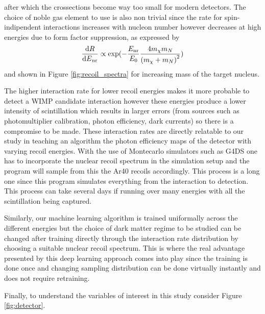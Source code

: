 \documentclass[11pt]{article} %
\begin{document}
after which the crossections become way too small for modern detectors.
The choice of noble gas element to use is also non trivial since the rate for spin-indipendent interactions increases with
nucleon number however decreases at high energies due to form factor suppression, as expressed by \cite{lewin1996review} 
\begin{equation}
\frac{{\rm{d}}{R}}{{{\rm{d}}{E}}_{\mathrm{nr}}}\propto \exp (- \frac{{E}_{\mathrm{nr}}}{{E}_{0}} \frac{4{m}_{\chi }{m}_{N}}{{({m}_{\chi }+{m}_{N})}^{2}})
\end{equation}
and shown in Figure \ref{fig:recoil_spectra} for increasing mass of the target nucleus.
\\
\par The higher interaction rate for lower recoil energies makes it more probable to detect a WIMP candidate interaction
however these energies produce a lower intensity of scintillation which results in larger errors
 (from sources such as photomultiplier calibration, photon efficiency, dark currents) so there is a compromise to be made.
These interaction rates are directly relatable to our study in teaching an algorithm the photon efficiency maps of the detector
with varying recoil energies.
With the use of Montecarlo simulators such as G4DS one has to incorporate the nuclear recoil spectrum in the simulation setup
and the program will sample from this the Ar40 recoils accordingly.
This process is a long one since this program simulates everything from the interaction to detection.
This process can take several days if running over many energies with all the scintillation being captured.
\\
\par Similarly, our machine learning algorithm is trained uniformally across the different energies but the choice of 
dark matter regime to be studied can be changed after training directly through the interaction rate distribution by choosing a suitable nuclear recoil spectrum.
This is where the real advantage presented by this deep learning approach comes into play since the training is done once and changing 
sampling distribution can be done virtually instantly and does not require retraining.
\\
\par Finally, to understand the variables of interest in this study consider Figure \ref{fig:detector}.
\end{document}
